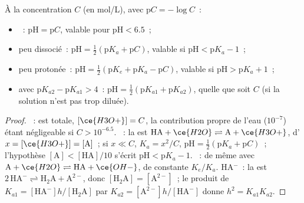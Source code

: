 \begin{proposition}\label{prop:b1:predominant-reaction:ph-formulas}
À la concentration $C$ (en \unit{mol/L}), avec $\mathrm{p}C = -\log C$~:
\begin{itemize}
  \item {}~: $\mathrm{pH} = \mathrm{p}C$, valable pour
        $\mathrm{pH} < 6.5$~;
  \item {} peu dissocié~: $\mathrm{pH} = \frac12(\mathrm{p}K_a
        + \mathrm{p}C)$, valable si $\mathrm{pH} < \mathrm{p}K_a - 1$~;
  \item {} peu protonée~: $\mathrm{pH} = \frac12(\mathrm{p}K_e +
        \mathrm{p}K_a - \mathrm{p}C)$, valable si $\mathrm{pH} > \mathrm{p}K_a +
        1$~;
  \item {} avec $\mathrm{p}K_{a2} - \mathrm{p}K_{a1} > 4$~:
        $\mathrm{pH} = \frac12(\mathrm{p}K_{a1} + \mathrm{p}K_{a2})$,
        quelle que soit $C$ (si la solution n'est pas trop diluée).
\end{itemize}
\end{proposition}

\begin{proof}
~:  est totale, $[\ce{H3O+}] = C$,
la contribution propre de l'eau ($10^{-7}$) étant négligeable si
$C > 10^{-6.5}$.
~: la  est $\mathrm{HA} + \ce{H2O}
\rightleftharpoons \mathrm{A} + \ce{H3O+}$, d' $x = [\ce{H3O+}]
= [\mathrm{A}]$~; si $x \ll C$, $K_a = x^2/C$, $\mathrm{pH} = \frac12(\mathrm{p}K_a
+ \mathrm{p}C)$~; l'hypothèse $[\mathrm{A}] < [\mathrm{HA}]/10$ s'écrit
$\mathrm{pH} < \mathrm{p}K_a - 1$. ~: de même avec $\mathrm{A} +
\ce{H2O} \rightleftharpoons \mathrm{HA} + \ce{OH-}$, de constante $K_e/K_a$.
 HA$^-$~: la  est $2\,\mathrm{HA}^- \rightleftharpoons
\mathrm{H_2A} + \mathrm{A}^{2-}$, donc $[\mathrm{H_2A}] = [\mathrm{A}^{2-}]$~;
le produit de $K_{a1} = [\mathrm{HA}^-]h/[\mathrm{H_2A}]$ par $K_{a2} =
[\mathrm{A}^{2-}]h/[\mathrm{HA}^-]$ donne $h^2 = K_{a1}K_{a2}$.
\end{proof}

